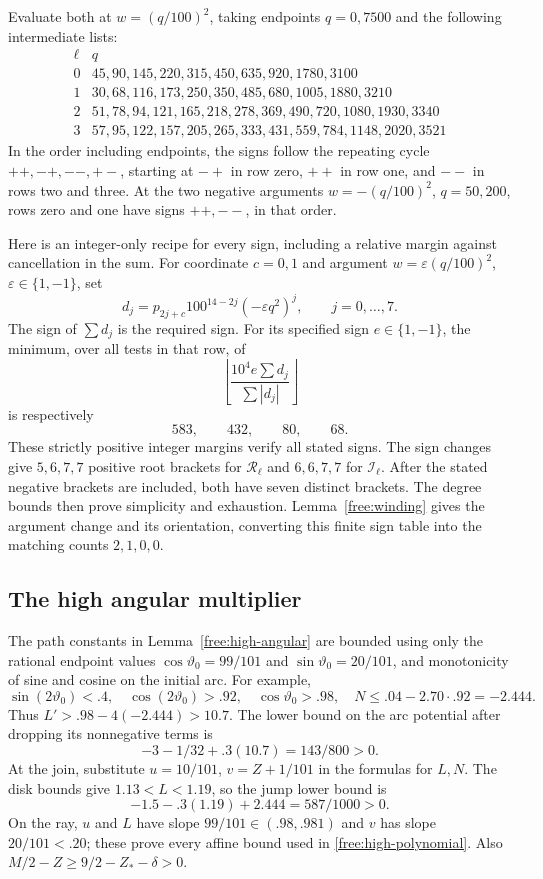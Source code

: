 Evaluate both at $w=(q/100)^2$, taking endpoints $q=0,7500$
and the following intermediate lists:
\[
\begin{array}{c|l}
 \ell&q\\\hline
 0&45,90,145,220,315,450,635,920,1780,3100\\
 1&30,68,116,173,250,350,485,680,1005,1880,3210\\
 2&51,78,94,121,165,218,278,369,490,720,1080,1930,3340\\
 3&57,95,122,157,205,265,333,431,559,784,1148,2020,3521
\end{array}
\]
In the order including endpoints, the signs follow the repeating
cycle $++,-+,--,+-$, starting at $-+$ in row zero, $++$ in row one,
and $--$ in rows two and three.  At the two negative arguments
$w=-(q/100)^2$, $q=50,200$, rows zero and one have signs $++,--$,
in that order.

Here is an integer-only recipe for every sign, including a relative
margin against cancellation in the sum.  For coordinate $c=0,1$ and
argument $w=\varepsilon(q/100)^2$, $\varepsilon\in\{1,-1\}$, set
\[
 d_j=p_{2j+c}100^{14-2j}(-\varepsilon q^2)^j,
 \qquad j=0,\ldots,7.
\]
The sign of $\sum d_j$ is the required sign.  For its specified sign
$e\in\{1,-1\}$, the minimum, over all tests in that row, of
\[
 \left\lfloor\frac{10^4e\sum d_j}{\sum|d_j|}\right\rfloor
\]
is respectively
\begin{equation}\label{cert:separator-margins}
 583,\qquad432,\qquad80,\qquad68.
\end{equation}
These strictly positive integer margins verify all stated signs.
The sign changes give $5,6,7,7$ positive root brackets for
$\mathcal R_\ell$ and $6,6,7,7$ for $\mathcal I_\ell$.
After the stated negative brackets are included, both have seven
distinct brackets.  The degree bounds then prove simplicity and
exhaustion.  Lemma~\ref{free:winding} gives the argument change and
its orientation, converting this finite sign table into the matching
counts $2,1,0,0$.

\subsection{The high angular multiplier}\label{cert:high-angular}

The path constants in Lemma~\ref{free:high-angular} are bounded using
only the rational endpoint values $\cos\vartheta_0=99/101$ and
$\sin\vartheta_0=20/101$, and monotonicity of sine and cosine on the
initial arc.  For example,
\[
 \sin(2\vartheta_0)<.4,\quad \cos(2\vartheta_0)>.92,
 \quad \cos\vartheta_0>.98,
 \quad N\le.04-2.70\cdot.92=-2.444.
\]
Thus $L'>.98-4(-2.444)>10.7$.  The lower bound on the arc potential
after dropping its nonnegative terms is
\[
 -3-1/32+.3(10.7)=143/800>0.
\]
At the join, substitute
$u=10/101$, $v=Z+1/101$ in the formulas for $L,N$.
The disk bounds give $1.13<L<1.19$, so the jump lower bound is
\[
 -1.5-.3(1.19)+2.444=587/1000>0.
\]
On the ray, $u$ and $L$ have slope $99/101\in(.98,.981)$
and $v$ has slope $20/101<.20$; these prove every affine bound used
in \eqref{free:high-polynomial}.  Also $M/2-Z\ge9/2-Z_*-\delta>0$.

